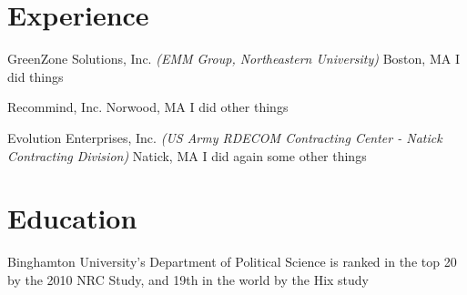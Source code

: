 \documentclass[10pt,a4paper]{moderncv}
\begin{document}
\makecvtitle
\section{Experience}
         {GreenZone Solutions, Inc.}
         {\textit{(EMM Group, Northeastern University)} Boston, MA}
         {}{I did things}

         {Recommind, Inc.}
         {Norwood, MA}
         {}{I did other things}

         {Evolution Enterprises, Inc.}
         {\textit{(US Army RDECOM Contracting Center - Natick Contracting Division)} Natick, MA}
         {}{I did again some other things}
         
\section{Education}
         {}{}{Binghamton University’s Department of
           Political Science is ranked in the top 20 by the
           2010 NRC Study, and 19th in the world by the Hix study}
         
         {}{}{}
         
\end{document}

